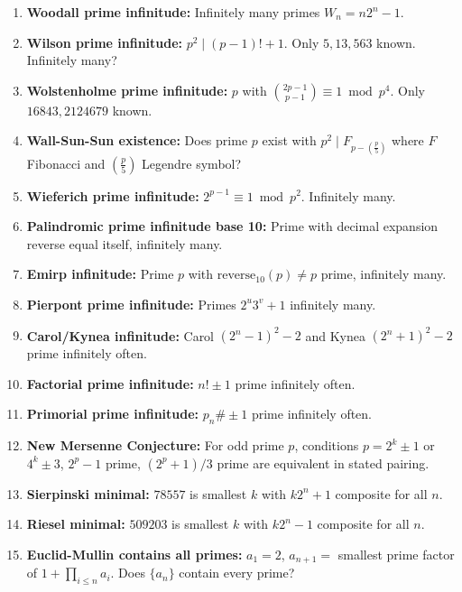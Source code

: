 \documentclass[aps,prd,amsmath,amssymb,twocolumn,superscriptaddress]{revtex4-2}
\begin{document}
\begin{enumerate}[label={\bf \arabic*.}, leftmargin=*, itemsep=2pt]
\item \textbf{Woodall prime infinitude:} Infinitely many primes $W_n=n2^n-1$.

\item \textbf{Wilson prime infinitude:} $p^2\mid(p-1)!+1$. Only $5,13,563$ known. Infinitely many?

\item \textbf{Wolstenholme prime infinitude:} $p$ with $\binom{2p-1}{p-1}\equiv1\bmod p^4$. Only $16843,2124679$ known.

\item \textbf{Wall-Sun-Sun existence:} Does prime $p$ exist with $p^2\mid F_{p-(\frac{p}{5})}$ where $F$ Fibonacci and $(\frac{p}{5})$ Legendre symbol?

\item \textbf{Wieferich prime infinitude:} $2^{p-1}\equiv1\bmod p^2$. Infinitely many.

\item \textbf{Palindromic prime infinitude base 10:} Prime with decimal expansion reverse equal itself, infinitely many.

\item \textbf{Emirp infinitude:} Prime $p$ with $\text{reverse}_{10}(p)\neq p$ prime, infinitely many.

\item \textbf{Pierpont prime infinitude:} Primes $2^u3^v+1$ infinitely many.

\item \textbf{Carol/Kynea infinitude:} Carol $(2^n-1)^2-2$ and Kynea $(2^n+1)^2-2$ prime infinitely often.

\item \textbf{Factorial prime infinitude:} $n!\pm1$ prime infinitely often.

\item \textbf{Primorial prime infinitude:} $p_n\#\pm1$ prime infinitely often.

\item \textbf{New Mersenne Conjecture:} For odd prime $p$, conditions $p=2^k\pm1$ or $4^k\pm3$, $2^p-1$ prime, $(2^p+1)/3$ prime are equivalent in stated pairing.

\item \textbf{Sierpinski minimal:} $78557$ is smallest $k$ with $k2^n+1$ composite for all $n$.

\item \textbf{Riesel minimal:} $509203$ is smallest $k$ with $k2^n-1$ composite for all $n$.

\item \textbf{Euclid-Mullin contains all primes:} $a_1=2$, $a_{n+1}=$ smallest prime factor of $1+\prod_{i\le n}a_i$. Does $\{a_n\}$ contain every prime?


\end{enumerate}
\end{document}
